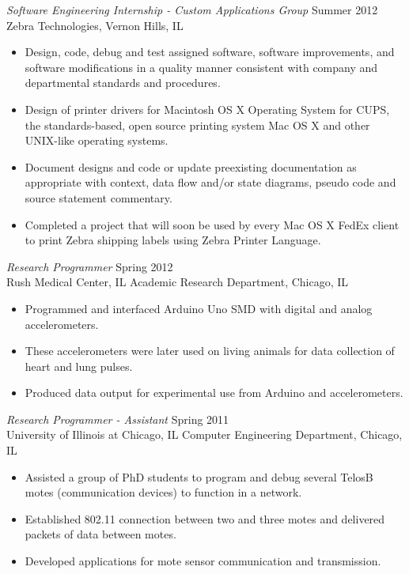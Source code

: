 \documentclass[margin]{res}
\begin{document}
\begin{resume}
{\sl Software Engineering Internship - Custom Applications Group} \hfill            Summer 2012\\
    Zebra Technologies, Vernon Hills, IL
	\begin{itemize}  \itemsep -2pt %
	\item Design, code, debug and test assigned software, software improvements, and software modifications in a quality manner consistent with company and departmental standards and procedures.
	\item Design of printer drivers for Macintosh OS X Operating System for CUPS, the standards-based, open source printing system Mac OS X and other UNIX-like operating systems.
	\item Document designs and code or update preexisting documentation as appropriate with context, data flow and/or state diagrams, pseudo code and source statement commentary.
	\item Completed a project that will soon be used by every Mac OS X FedEx client to print Zebra shipping labels using Zebra Printer Language.
	\end{itemize}
                 
{\sl Research Programmer } \hfill            Spring 2012\\
	Rush Medical Center, IL
	Academic Research Department, Chicago, IL
	\begin{itemize}  \itemsep -2pt %
	\item Programmed and interfaced Arduino Uno SMD with digital and analog accelerometers.
	\item These accelerometers were later used on living animals for data collection of heart and lung pulses.
	\item Produced data output for experimental use from Arduino and accelerometers.
	\end{itemize}
                 
{\sl Research Programmer - Assistant } \hfill            Spring 2011\\
	University of Illinois at Chicago, IL
	Computer Engineering Department, Chicago, IL
	\begin{itemize}  \itemsep -2pt %
	\item Assisted a group of PhD students to program and debug several TelosB motes (communication devices) to function in a network.
	\item Established 802.11 connection between two and three motes and delivered packets of data between motes.
	\item Developed applications for mote sensor communication and transmission.
	\end{itemize}   
            

\end{resume}
\end{document}
